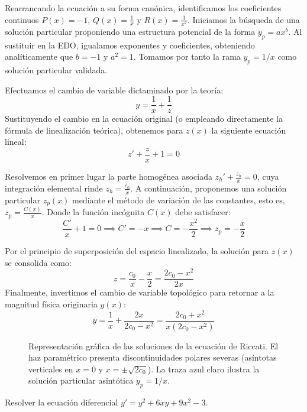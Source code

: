 \begin{tcolorbox}
Rearrancando la ecuación a su forma canónica, identificamos los coeficientes continuos $P(x) = -1$, $Q(x) = \frac{1}{x}$ y $R(x) = \frac{1}{x^2}$.
Iniciamos la búsqueda de una solución particular proponiendo una estructura potencial de la forma $y_p = a x^b$. Al sustituir en la EDO, igualamos exponentes y coeficientes, obteniendo analíticamente que $b = -1$ y $a^2 = 1$. Tomamos por tanto la rama $y_p = 1/x$ como solución particular validada.

Efectuamos el cambio de variable dictaminado por la teoría:
$$ y = \frac{1}{x} + \frac{1}{z} $$
Sustituyendo el cambio en la ecuación original (o empleando directamente la fórmula de linealización teórica), obtenemos para $z(x)$ la siguiente ecuación lineal:
$$ z' + \frac{z}{x} + 1 = 0 $$

Resolvemos en primer lugar la parte homogénea asociada $z_h' + \frac{z_h}{x} = 0$, cuya integración elemental rinde $z_h = \frac{c_0}{x}$.
A continuación, proponemos una solución particular $z_p(x)$ mediante el método de variación de las constantes, esto es, $z_p = \frac{C(x)}{x}$. Donde la función incógnita $C(x)$ debe satisfacer:
$$ \frac{C'}{x} + 1 = 0 \implies C' = -x \implies C = -\frac{x^2}{2} \implies z_p = -\frac{x}{2} $$

Por el principio de superposición del espacio linealizado, la solución para $z(x)$ se consolida como:
$$ z = \frac{c_0}{x} - \frac{x}{2} = \frac{2c_0 - x^2}{2x} $$
Finalmente, invertimos el cambio de variable topológico para retornar a la magnitud física originaria $y(x)$:
$$ y = \frac{1}{x} + \frac{2x}{2c_0 - x^2} = \frac{2c_0 + x^2}{x(2c_0 - x^2)} $$

\begin{figure}[H]
    \centering
    
    \caption{Representación gráfica de las soluciones de la ecuación de Riccati. El haz paramétrico presenta discontinuidades polares severas (asíntotas verticales en $x=0$ y $x=\pm\sqrt{2c_0}$). La traza azul claro ilustra la solución particular asintótica $y_p=1/x$.}
\end{figure}
\end{tcolorbox}

\begin{ejercicio}
Resolver la ecuación diferencial $y' = y^2 + 6xy + 9x^2 - 3$.
\end{ejercicio}

